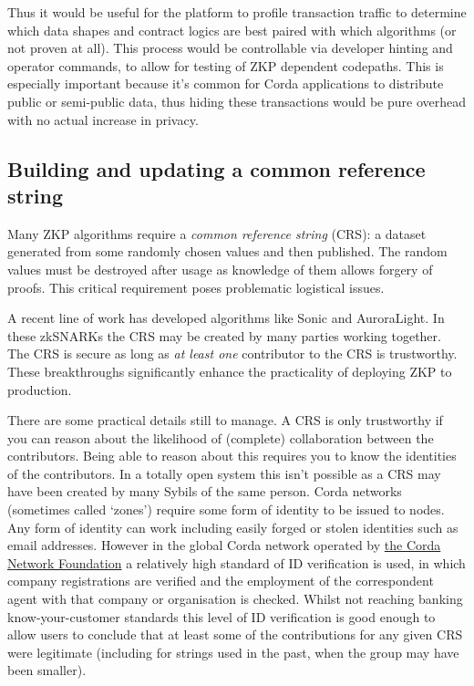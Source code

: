 \documentclass{article}
\begin{document}
Thus it would be useful for the platform to profile transaction traffic to determine which data shapes and contract
logics are best paired with which algorithms (or not proven at all). This process would be controllable via
developer hinting and operator commands, to allow for testing of ZKP dependent codepaths. This is especially
important because it's common for Corda applications to distribute public or semi-public data, thus hiding these
transactions would be pure overhead with no actual increase in privacy.

\subsection{Building and updating a common reference string}\label{subsec:building-and-updating-a-common-reference-string}

Many ZKP algorithms require a \emph{common reference string} (CRS): a dataset generated from some randomly chosen values
and then published. The random values must be destroyed after usage as knowledge of them allows forgery of proofs.
This critical requirement poses problematic logistical issues.

A recent line of work has developed algorithms like Sonic\cite{cryptoeprint:2019:099} and
AuroraLight\cite{cryptoeprint:2019:601}. In these zkSNARKs the CRS may be created by many parties working together.
The CRS is secure as long as \emph{at least one} contributor to the CRS is trustworthy. These breakthroughs
significantly enhance the practicality of deploying ZKP to production.

There are some practical details still to manage. A CRS is only trustworthy if you can reason about the likelihood
of (complete) collaboration between the contributors. Being able to reason about this requires you to know the
identities of the contributors. In a totally open system this isn't possible as a CRS may have been created by many
Sybils of the same person. Corda networks (sometimes called `zones') require some form of identity to be issued to
nodes. Any form of identity can work including easily forged or stolen identities such as email addresses. However
in the global Corda network operated by \href{https://corda.network}{the Corda Network Foundation} a relatively
high standard of ID verification is used, in which company registrations are verified and the employment of the
correspondent agent with that company or organisation is checked. Whilst not reaching banking know-your-customer
standards this level of ID verification is good enough to allow users to conclude that at least some of the
contributions for any given CRS were legitimate (including for strings used in the past, when the group may have
been smaller).
\end{document}
